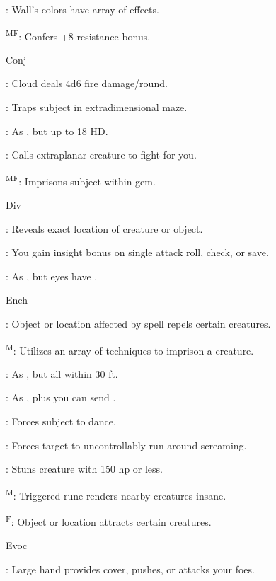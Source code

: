 : Wall's colors have array of effects.

\textsuperscript{M}\textsuperscript{F}: Confers +8 resistance bonus.

Conj

: Cloud deals 4d6 fire damage/round.

: Traps subject in extradimensional maze.

: As , but up to 18 HD.

: Calls extraplanar creature to fight for you.

\textsuperscript{M}\textsuperscript{F}: Imprisons subject within gem.

Div

: Reveals exact location of creature or object.

: You gain insight bonus on single attack roll, check, or save.

: As , but eyes have .

Ench

: Object or location affected by spell repels certain creatures.

\textsuperscript{M}: Utilizes an array of techniques to imprison a creature.

: As , but all within 30 ft.

: As , plus you can send .

: Forces subject to dance.

: Forces target to uncontrollably run around screaming.

: Stuns creature with 150 hp or less.

\textsuperscript{M}: Triggered rune renders nearby creatures insane.

\textsuperscript{F}: Object or location attracts certain creatures.

Evoc

: Large hand provides cover, pushes, or attacks your foes.

